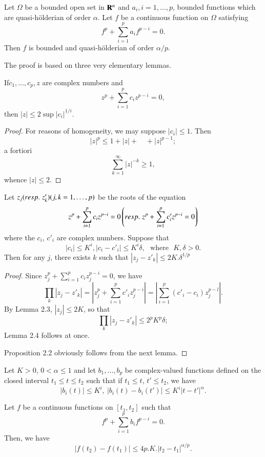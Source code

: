 \setcounter{theorem}{1}
\begin{proposition}\label{chap4-prop2.2}%
  Let $\Omega$ be a bounded open set in $\mathbf{R}^n$ and $a_i, i =1, \ldots, p$, bounded functions which are quasi-h\"olderian of order $\alpha$. Let $f$ be a continuous function on $\Omega$ satisfying
  $$
f^{p} + \sum\limits^p_{i=1} a_i f^{p-i} = 0.
$$
Then $f$ is bounded and quasi-h\"olderian of order $\alpha/p$.
\end{proposition}

The proof is based on three  very elementary lemmas.

\begin{lemma}\label{chap4-lem2.3}%
  If\pageoriginale $c_1, \ldots, c_p, z$ are complex numbers and
  $$
z^p + \sum\limits^p_{i=1} c_i z^{p-i} = 0,
  $$
then $|z| \leq 2 \sup |c_i|^{1/i}$.
\end{lemma}

\begin{proof}
  For reasons of homogeneity, we may suppose $|c_i|\leq 1$. Then
  $$
|z|^p \leq 1+ |z| + \quad + |z|^{p-1};
$$
a fortiori
$$
\sum\limits^{\infty}_{k=1} |z|^{-k} \geq 1,
$$
whence $|z| \leq 2$.
\end{proof}

\begin{lemma}\label{chap4-lem2.4}%
  Let $z_j ({resp.}\kern.3em z'_k) (j, k =1, \ldots, p)$ be the roots of the equation
  $$
  z^p + \sum\limits^{p}_{i=1} c_i z^{p-i} = 0 \left({resp.}\kern.3em z^p + \sum\limits^p_{i=1} c'_i z^{p-i} = 0 \right)
  $$
  where the $c_i$, $c'_i$ are complex numbers. Suppose that
  $$
  |c_i| \leq K^i, |c_i - c'_i| \leq K^i \delta, \text{~ where ~} K, \delta > 0.
  $$
  Then for any $j$, there exists $k$ such that $|z_j - z'_k| \leq 2 K.\delta^{1/p}$
\end{lemma}

\begin{proof}
  Since $z^p_j + \sum\limits^p_{i=1} c_i z^{p-i}_j =0$, we have
  $$
\prod\limits_k  |z_j - z'_k| = \left|z^p_j + \sum\limits^p_{i=1} c'_i z^{p-i}_j\right| = \left|\sum\limits^p_{i=1} (c'_i - c_i) z^{p-l}_j\right|.
  $$
By Lemma 2.3, $|z_j| \leq 2K$, so that
$$
\prod\limits_k |z_j - z'_k| \leq 2^p K^p \delta ;
$$
Lemma 2.4 follows at once.

Proposition 2.2 obviously follows from the next lemma.
\end{proof}


\begin{lemma}\label{chap4-lem2.5}%
  Let $K >0$, $0 < \alpha \leq 1$ and let $b_1, \ldots, b_p$ be  complex-valued functions defined on the closed interval $t_1 \leq t \leq t_2$ such that if $t_1 \leq t$, $t'\leq t_2$, we have
  $$
  |b_i(t)| \leq K^i, ~|b_i (t) - b_i (t')| \leq K^i |t - t'|^\alpha.
  $$\pageoriginale

  Let $f$ be a continuous functions on $[t_1, t_2]$ such that
  $$
f^p + \sum\limits^p_{i=1} b_i f^{p-i} = 0.
$$
Then, we have
$$
|f(t_2) - f(t_1)| \leq 4p. K. |t_2 - t_1|^{\alpha/p}.
$$
\end{lemma}

